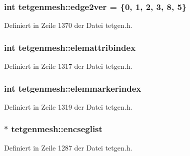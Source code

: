 \hypertarget{classtetgenmesh_a5c068f480e2912a38c19bbbd492e2aae}{
\subsubsection[{edge2ver}]{\setlength{\rightskip}{0pt plus 5cm}int tetgenmesh\-::edge2ver = \{0, 1, 2, 3, 8, 5\}\hspace{0.3cm}{\ttfamily [static]}}}\label{classtetgenmesh_a5c068f480e2912a38c19bbbd492e2aae}


Definiert in Zeile 1370 der Datei tetgen.\-h.

\hypertarget{classtetgenmesh_a52dfc8427820c4f4d2c3209b05897b3f}{
\subsubsection[{elemattribindex}]{\setlength{\rightskip}{0pt plus 5cm}int tetgenmesh\-::elemattribindex}}\label{classtetgenmesh_a52dfc8427820c4f4d2c3209b05897b3f}


Definiert in Zeile 1317 der Datei tetgen.\-h.

\hypertarget{classtetgenmesh_a7aa641823e09c9762b497ed098133e70}{
\subsubsection[{elemmarkerindex}]{\setlength{\rightskip}{0pt plus 5cm}int tetgenmesh\-::elemmarkerindex}}\label{classtetgenmesh_a7aa641823e09c9762b497ed098133e70}


Definiert in Zeile 1319 der Datei tetgen.\-h.

\hypertarget{classtetgenmesh_abc420f3eb006345cfd37515eda36e1cc}{
\subsubsection[{encseglist}]{$\ast$ tetgenmesh\-::encseglist}}\label{classtetgenmesh_abc420f3eb006345cfd37515eda36e1cc}


Definiert in Zeile 1287 der Datei tetgen.\-h.

